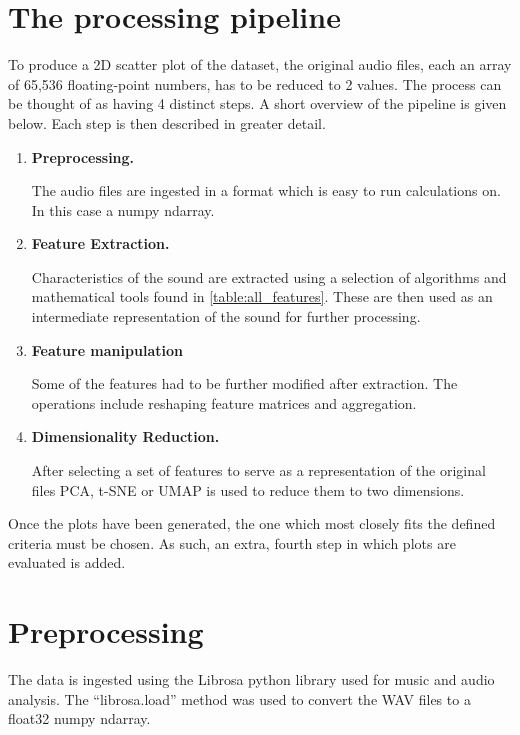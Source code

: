 \documentclass[a4paper, 12pt, twoside]{report}
\begin{document}
\section{The processing pipeline}
\label{sec:org82c3cb3}

To produce a 2D scatter plot of the dataset, the original audio files, each an array of 65,536 floating-point numbers, has to be reduced to 2 values.
The process can be thought of as having 4 distinct steps. A short overview of the pipeline is given below. Each step is then described in greater detail.

\begin{enumerate}
\item \textbf{ Preprocessing. }

The audio files are ingested in a format which is easy to run calculations on. In this case a numpy ndarray.
\item \textbf{ Feature Extraction. }

Characteristics of the sound are extracted using a selection of algorithms and mathematical tools found in \ref{table:all_features}. These are then used as an intermediate representation of the sound for further processing.
\item \textbf{ Feature manipulation }

Some of the features had to be further modified after extraction. The operations include reshaping feature matrices and aggregation.
\item \textbf{ Dimensionality Reduction. }

After selecting a set of features to serve as a representation of the original files PCA, t-SNE or UMAP is used to reduce them to two dimensions.
\end{enumerate}
Once the plots have been generated, the one which most closely fits the defined criteria must be chosen. As such, an extra, fourth step in which plots are evaluated is added.

\section{Preprocessing}
\label{sec:org1f10704}

The data is ingested using the Librosa python library \cite{librosa} used for music and audio analysis. The ``librosa.load'' method was used to convert the WAV files to a float32 numpy ndarray.
\end{document}
